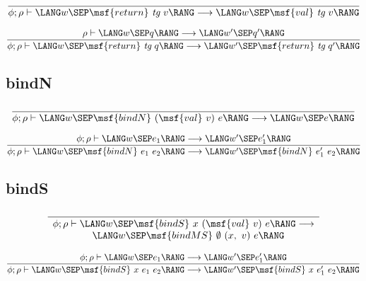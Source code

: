 \documentclass{article}
\begin{document}
\begin{gather}
  \frac{}{ \phi; \rho \vdash \LANG w \SEP \msf{return} \ \mbox{\it tg}
    \ v \RANG \longrightarrow \LANG w \SEP \msf{val} \ \mbox{\it tg}
    \ v \RANG }
\end{gather}


\begin{gather}
  \frac{ \rho \vdash \LANG w \SEP q \RANG \longrightarrow \LANG w'
    \SEP q' \RANG } { \phi; \rho \vdash \LANG w \SEP \msf{return}
    \ \mbox{\it tg} \ q \RANG \longrightarrow \LANG w' \SEP
    \msf{return} \ \mbox{\it tg} \ q' \RANG }
\end{gather}




\subsection{bindN}

\begin{gather}
  \frac{}{ \phi; \rho \vdash \LANG w \SEP \msf{bindN} \ (\msf{val}
    \ v) \ e \RANG \longrightarrow \LANG w \SEP e \RANG }
\end{gather}


\begin{gather}
  \frac{ \phi; \rho \vdash \LANG w \SEP e_1 \RANG \longrightarrow
    \LANG w' \SEP e'_1 \RANG }{ \phi; \rho \vdash \LANG w \SEP
    \msf{bindN} \ e_1 \ e_2 \RANG \longrightarrow \LANG w' \SEP
    \msf{bindN} \ e'_1 \ e_2 \RANG }
\end{gather}




\subsection{bindS}

\begin{gather}
  \frac{ }{
\begin{array}{lll}
    \phi; \rho \vdash \LANG w \SEP \msf{bindS} \ x \ (\msf{val} \ v)
    \ e \RANG \longrightarrow \\ \qquad \qquad \LANG w \SEP
    \msf{bindMS} \ \emptyset \ (x, \ v) \ e \RANG
\end{array} }
\end{gather}

\begin{gather}
  \frac{ \phi; \rho \vdash \LANG w \SEP e_1 \RANG \longrightarrow
    \LANG w' \SEP e'_1 \RANG }{ \phi; \rho \vdash \LANG w \SEP
    \msf{bindS} \ x \ e_1 \ e_2 \RANG \longrightarrow \LANG w' \SEP
    \msf{bindS} \ x \ e'_1 \ e_2 \RANG }
\end{gather}
\end{document}

